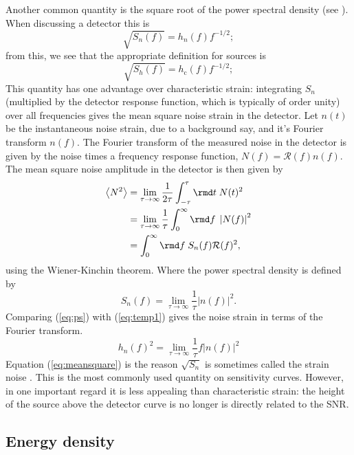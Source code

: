 \documentclass[fleqn,12pt]{iopart}
\newcommand{\sub}[1]{\ensuremath{_\mathrm{#1}}}
\begin{document}
Another common quantity is the square root of the power spectral density (see ). When discussing a detector this is
\begin{equation}
\label{eq:temp1}
\sqrt{S_{n}(f)} = h_{n}(f)f^{-1/2};
\end{equation}
from this, we see that the appropriate definition for sources is
\begin{equation}
\label{eq:temp1}
\sqrt{S_{h}(f)} = h\sub{c}(f)f^{-1/2};
\end{equation}
This quantity has one advantage over characteristic strain: integrating $S_{n}$ (multiplied by the detector response function, which is typically of order unity) over all frequencies gives the mean square noise strain in the detector. Let $n(t)$ be the instantaneous noise strain, due to a background say, and it's Fourier transform $n(f)$. The Fourier transform of the measured noise in the detector is given by the noise times a frequency response function, $N(f) = {\mathcal{R}}(f)n(f)$. The mean square noise amplitude in the detector is then given by
\begin{eqnarray} \label{eq:meansquare}
\left< N^{2} \right> &= \lim_{\tau \rightarrow \infty} \frac{1}{2\tau} \int_{-\tau}^{\tau}\rmd t\; N(t)^{2} \nonumber \\
 &= \lim_{\tau\rightarrow\infty}\frac{1}{\tau}\int_{0}^{\infty}\rmd f\;\left|N(f)\right|^{2} \nonumber\\
 &= \int_{0}^{\infty}\rmd f\; S_{n}(f){\mathcal{R}}(f)^{2},
\end{eqnarray}
using the Wiener-Kinchin theorem. Where the power spectral density is defined by
\begin{equation}\label{eq:ps}
S_{n}(f) = \lim_{\tau\rightarrow\infty}\frac{1}{\tau}\left|n(f)\right|^{2}.
\end{equation}
Comparing (\ref{eq:ps}) with (\ref{eq:temp1}) gives the noise strain in terms of the Fourier transform.
\begin{equation}
h_{n}(f)^{2} = \lim_{\tau\rightarrow\infty}\frac{1}{\tau}f\left| n(f) \right|^{2}
\end{equation}
Equation (\ref{eq:meansquare}) is the reason $\sqrt{S_{n}}$ is sometimes called the strain noise \citep{Phinney2001}. This is the most commonly used quantity on sensitivity curves. However, in one important regard it is less appealing than characteristic strain: the height of the source above the detector curve is no longer is directly related to the SNR.

\subsection{Energy density}
\end{document}
